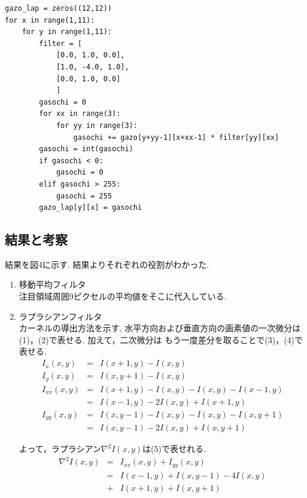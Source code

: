 \documentclass[twocolumn, 10pt,a4j]{jsarticle}
\begin{document}
\begin{lstlisting}[caption=kadai4Laplasian.py, label=p4_txt]
gazo_lap = zeros((12,12))
for x in range(1,11):
    for y in range(1,11):
        filter = [
            [0.0, 1.0, 0.0],
            [1.0, -4.0, 1.0],
            [0.0, 1.0, 0.0]
            ]
        gasochi = 0
        for xx in range(3):
            for yy in range(3):
                gasochi += gazo[y+yy-1][x+xx-1] * filter[yy][xx]
        gasochi = int(gasochi) 
        if gasochi < 0:
            gasochi = 0
        elif gasochi > 255:
            gasochi = 255
        gazo_lap[y][x] = gasochi
\end{lstlisting}


    \subsection{結果と考察}
        結果を図4に示す. 結果よりそれぞれの役割がわかった.
        \begin{enumerate}
            \item 移動平均フィルタ \\
                注目領域周囲9ピクセルの平均値をそこに代入している.
            \item ラプラシアンフィルタ \\
                カーネルの導出方法を示す. 水平方向および垂直方向の画素値の一次微分は(1)，(2)で表せる. 加えて，二次微分は
                もう一度差分を取ることで(3)，(4)で表せる.
                \begin{eqnarray}
                    I_{x}(x, y) &=& I(x+1, y) - I(x, y) \\
                    I_{y}(x, y) &=& I(x, y+1) - I(x, y) \\
                    I_{xx}(x, y) &=& I(x+1, y) - I(x, y) - I(x, y) - I(x -1, y) \nonumber \\ 
                    &=& I(x-1, y) - 2I(x, y) + I(x+1, y) \\
                    I_{yy}(x, y) &=& I(x, y-1) - I(x, y) - I(x, y) - I(x, y+1) \nonumber \\ 
                    &=& I(x, y-1) - 2I(x, y) + I(x, y+1)
                \end{eqnarray}

                よって，ラプラシアン$\nabla^2 I(x, y)$は(5)で表せれる.
                \begin{eqnarray}
                    \nabla^2 I(x, y) &=& I_{xx}(x, y) + I_{yy}(x, y) \nonumber \\
                    &=& I(x-1, y) + I(x, y-1) - 4I(x, y) \nonumber \\
                    &+& I(x+1, y) + I(x, y+1)
                \end{eqnarray}
        \end{enumerate}
\end{document}
